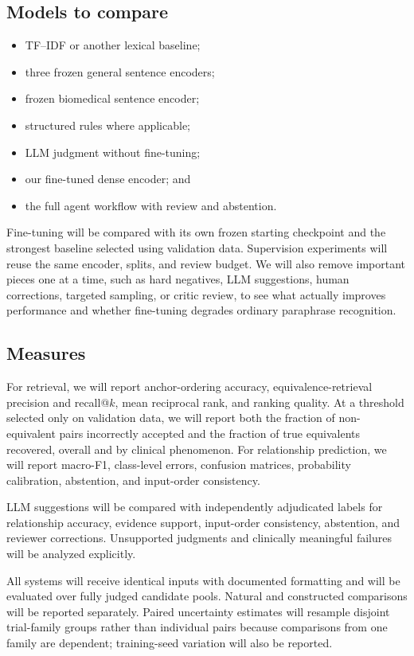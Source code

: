 \documentclass[11pt]{article}
\begin{document}
\subsection{Models to compare}

\begin{itemize}
    \item TF--IDF or another lexical baseline;
    \item three frozen general sentence encoders;
    \item frozen biomedical sentence encoder;
    \item structured rules where applicable;
    \item LLM judgment without fine-tuning;
    \item our fine-tuned dense encoder; and
    \item the full agent workflow with review and abstention.
\end{itemize}

Fine-tuning will be compared with its own frozen starting checkpoint and the strongest baseline selected using validation data. Supervision experiments will reuse the same encoder, splits, and review budget. We will also remove important pieces one at a time, such as hard negatives, LLM suggestions, human corrections, targeted sampling, or critic review, to see what actually improves performance and whether fine-tuning degrades ordinary paraphrase recognition.

\subsection{Measures}

For retrieval, we will report anchor-ordering accuracy, equivalence-retrieval precision and recall@$k$, mean reciprocal rank, and ranking quality. At a threshold selected only on validation data, we will report both the fraction of non-equivalent pairs incorrectly accepted and the fraction of true equivalents recovered, overall and by clinical phenomenon. For relationship prediction, we will report macro-F1, class-level errors, confusion matrices, probability calibration, abstention, and input-order consistency.

LLM suggestions will be compared with independently adjudicated labels for relationship accuracy, evidence support, input-order consistency, abstention, and reviewer corrections. Unsupported judgments and clinically meaningful failures will be analyzed explicitly.

All systems will receive identical inputs with documented formatting and will be evaluated over fully judged candidate pools. Natural and constructed comparisons will be reported separately. Paired uncertainty estimates will resample disjoint trial-family groups rather than individual pairs because comparisons from one family are dependent; training-seed variation will also be reported.
\end{document}
